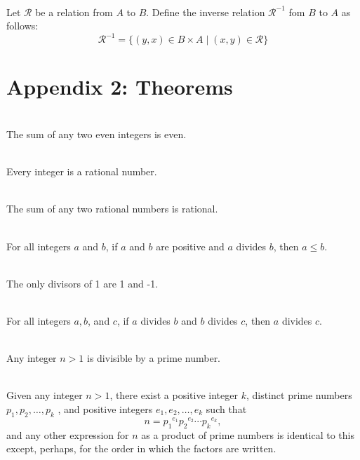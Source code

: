 \documentclass[12pt]{article}
\begin{document}
\begin{definition}
\hfill\\
\normalfont Let $\mathcal{R}$ be a relation from $A$ to $B$. Define the inverse relation $\mathcal{R}^{-1}$ fom $B$ to $A$ as follows:
\[
\mathcal{R}^{-1}=\{(y,x)\in B\times A\mid(x,y)\in \mathcal{R}\}
\]
\end{definition}
\clearpage
\section{Appendix 2: Theorems}
\begin{theorem}[4.1.1]
\hfill\\
\normalfont The sum of any two even integers is even.
\end{theorem}
\begin{theorem}[4.2.1]
\hfill\\
\normalfont Every integer is a rational number.
\end{theorem}
\begin{theorem}[4.2.2]
\hfill\\
\normalfont The sum of any two rational numbers is rational.
\end{theorem}
\begin{theorem}[4.3.1]
\hfill\\
\normalfont For all integers $a$ and $b$, if $a$ and $b$ are positive and $a$ divides $b$, then $a \leq b$.
\end{theorem}
\begin{theorem}[4.3.2]
\hfill\\
\normalfont The only divisors of 1 are 1 and -1.
\end{theorem}
\begin{theorem}[4.3.3]
\hfill\\
\normalfont For all integers $a, b$, and $c$, if $a$ divides $b$ and $b$ divides $c$, then $a$ divides $c$.
\end{theorem}
\begin{theorem}[4.3.4]
\hfill\\
\normalfont Any integer $n > 1$ is divisible by a prime number.
\end{theorem}
\begin{theorem}[4.3.5]
\hfill\\
\normalfont Given any integer $n > 1$, there exist a positive integer $k$, distinct prime numbers $p_1 , p_2 ,\ldots, p_k$ , and positive integers $e_1 , e_2 ,\ldots, e_k$ such that
\[n = {p_1}^{e_1} {p_2}^{e_2} \cdots{p_k}^{e_k},\]
and any other expression for $n$ as a product of prime numbers is identical to this except, perhaps, for the order in which the factors are written.
\end{theorem}
\end{document}
